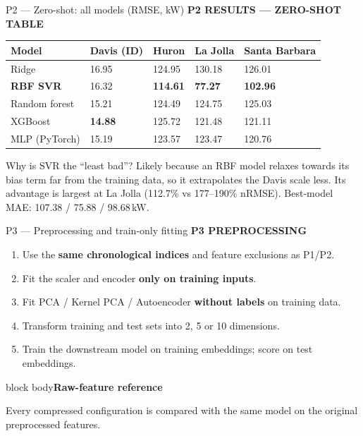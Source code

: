 \documentclass[aspectratio=169,11pt]{beamer}
\newcommand{\sectiontag}[1]{{\footnotesize\usebeamercolor[fg]{structure}\textbf{#1}}\par\vspace{0.10cm}}
\newcommand{\factbox}[2]{\begin{beamercolorbox}[sep=0.13cm,wd=\linewidth]{block body}{\bfseries #1}\par\small #2\end{beamercolorbox}}
\begin{document}
\begin{frame}{P2 — Zero-shot: all models (RMSE, kW)}
\sectiontag{P2 \quad RESULTS — ZERO-SHOT TABLE}
\small
\begin{tabularx}{\linewidth}{@{}P{3.0cm}YYYY@{}}\toprule
\textbf{Model} & \textbf{Davis (ID)} & \textbf{Huron} & \textbf{La Jolla} & \textbf{Santa Barbara}\\\midrule
Ridge & 16.95 & 124.95 & 130.18 & 126.01\\
\textbf{RBF SVR} & 16.32 & \textbf{114.61} & \textbf{77.27} & \textbf{102.96}\\
Random forest & 15.21 & 124.49 & 124.75 & 125.03\\
XGBoost & \textbf{14.88} & 125.72 & 121.48 & 121.11\\
MLP (PyTorch) & 15.19 & 123.57 & 123.47 & 120.76\\
\bottomrule\end{tabularx}\par
\vspace{0.22cm}
\begin{block}{Why is SVR the ``least bad''?}
\footnotesize Likely because an RBF model relaxes towards its bias term far from the training data, so it extrapolates the Davis scale less. Its advantage is largest at La Jolla (112.7\% vs 177--190\% nRMSE). Best-model MAE: 107.38 / 75.88 / 98.68\,kW.
\end{block}
\end{frame}

\begin{frame}{P3 — Preprocessing and train-only fitting}
\sectiontag{P3 \quad PREPROCESSING}
\begin{enumerate}\setlength\itemsep{0.38em}
\item Use the \textbf{same chronological indices} and feature exclusions as P1/P2.
\item Fit the scaler and encoder \textbf{only on training inputs}.
\item Fit PCA / Kernel PCA / Autoencoder \textbf{without labels} on training data.
\item Transform training and test sets into 2, 5 or 10 dimensions.
\item Train the downstream model on training embeddings; score on test embeddings.
\end{enumerate}
\vspace{0.08cm}
\factbox{Raw-feature reference}{Every compressed configuration is compared with the same model on the original preprocessed features.}
\end{frame}
\end{document}
